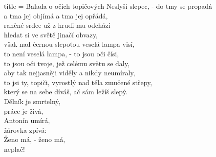 \begin{song}{title = {Balada o očích topičových}}
Neslyší slepec, - do tmy se propadá \\
a tma jej objímá a tma jej opřádá, \\
raněné srdce už z hrudi mu odchází \\
hledat si ve světě jinačí obvazy, \\
však nad černou slepotou veselá lampa visí, \\
to není veselá lampa, - to jsou oči čísi, \\
to jsou oči tvoje, jež celému světu se daly, \\
aby tak nejjasněji viděly a nikdy neumíraly, \\
to jsi ty, topiči, vyrostlý nad těla zmučené střepy, \\
který se na sebe díváš, ač sám ležíš slepý. \\

Dělník je smrtelný, \\
práce je živá, \\
Antonín umírá, \\
žárovka zpívá: \\

Ženo má, - ženo má, \\
neplač!
\end{song}
\newpage
